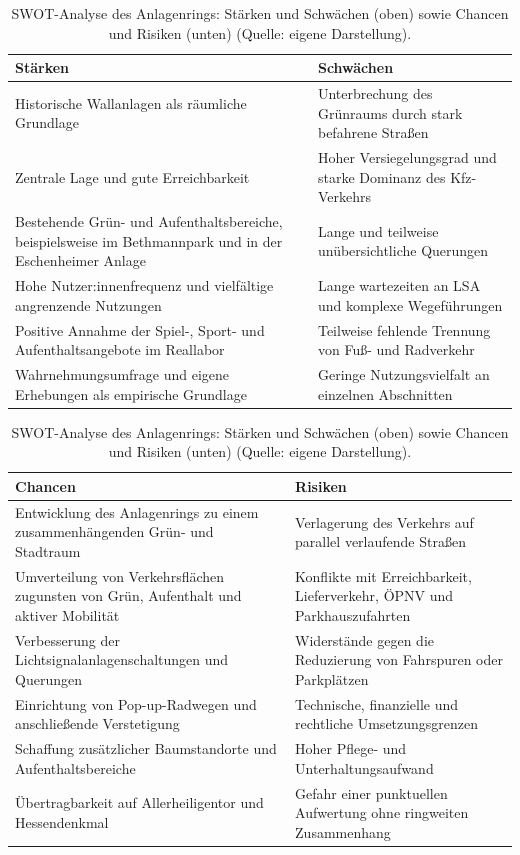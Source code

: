 \documentclass[a4paper,12pt]{article}
\begin{document}
\begin{table}[h]
	\centering
	\small
	\begin{tabularx}{\textwidth}{XX}
		\toprule
		\textbf{Stärken} & \textbf{Schwächen}\\
		\midrule
		Historische Wallanlagen als räumliche Grundlage & Unterbrechung des Grünraums durch stark befahrene Straßen\\[0.4em]
		Zentrale Lage und gute Erreichbarkeit & Hoher Versiegelungsgrad und starke Dominanz des Kfz-Verkehrs\\[0.4em]
		Bestehende Grün- und Aufenthaltsbereiche, beispielsweise im Bethmannpark und in der Eschenheimer Anlage & Lange und teilweise unübersichtliche Querungen\\[0.4em]
		Hohe Nutzer:innenfrequenz und vielfältige angrenzende Nutzungen & Lange wartezeiten an LSA und komplexe Wegeführungen\\[0.4em]
		Positive Annahme der Spiel-, Sport- und Aufenthaltsangebote im Reallabor & Teilweise fehlende Trennung von Fuß- und Radverkehr\\[0.4em]
		Wahrnehmungsumfrage und eigene Erhebungen als empirische Grundlage & Geringe Nutzungsvielfalt an einzelnen Abschnitten\\
		\bottomrule
	\end{tabularx}
	\vspace{1em}
	\begin{tabularx}{\textwidth}{XX}
		\toprule
		\textbf{Chancen} & \textbf{Risiken}\\
		\midrule
		Entwicklung des Anlagenrings zu einem zusammenhängenden Grün- und Stadtraum & Verlagerung des Verkehrs auf parallel verlaufende Straßen\\[0.4em]
		Umverteilung von Verkehrsflächen zugunsten von Grün, Aufenthalt und aktiver Mobilität & Konflikte mit Erreichbarkeit, Lieferverkehr, ÖPNV und Parkhauszufahrten\\[0.4em]
		Verbesserung der Lichtsignalanlagenschaltungen und Querungen & Widerstände gegen die Reduzierung von Fahrspuren oder Parkplätzen\\[0.4em]
		Einrichtung von Pop-up-Radwegen und anschließende Verstetigung & Technische, finanzielle und rechtliche Umsetzungsgrenzen\\[0.4em]
		Schaffung zusätzlicher Baumstandorte und Aufenthaltsbereiche & Hoher Pflege- und Unterhaltungsaufwand\\[0.4em]
		Übertragbarkeit auf Allerheiligentor und Hessendenkmal & Gefahr einer punktuellen Aufwertung ohne ringweiten Zusammenhang\\
		\bottomrule
	\end{tabularx}
	\caption[SWOT-Analyse des Anlagenrings]{SWOT-Analyse des Anlagenrings: Stärken und Schwächen (oben) sowie Chancen und Risiken (unten) (Quelle: eigene Darstellung).}
	\label{tab:swot}
\end{table}
\end{document}
